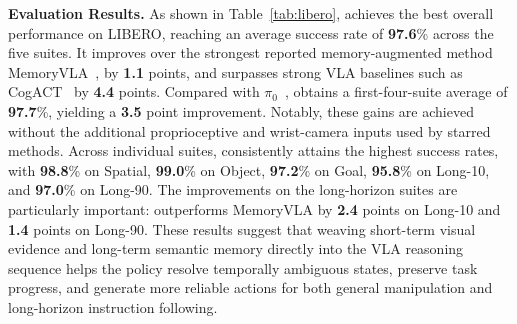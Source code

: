 \noindent\textbf{Evaluation Results.}
As shown in Table~\ref{tab:libero}, \ourmethod achieves the best overall performance on LIBERO, reaching an average success rate of \textbf{97.6}\% across the five suites.
It improves over the strongest reported memory-augmented method MemoryVLA~\citep{shi2025memoryvla}, by \textbf{1.1} points, and surpasses strong VLA baselines such as CogACT~\citep{li2024cogact} by \textbf{4.4} points.
Compared with $\pi_0$~\citep{black2024pi_0}, \ourmethod obtains a first-four-suite average of \textbf{97.7}\%, yielding a \textbf{3.5} point improvement.
Notably, these gains are achieved without the additional proprioceptive and wrist-camera inputs used by starred methods.
Across individual suites, \ourmethod consistently attains the highest success rates, with \textbf{98.8}\% on Spatial, \textbf{99.0}\% on Object, \textbf{97.2}\% on Goal, \textbf{95.8}\% on Long-10, and \textbf{97.0}\% on Long-90.
The improvements on the long-horizon suites are particularly important: \ourmethod outperforms MemoryVLA by \textbf{2.4} points on Long-10 and \textbf{1.4} points on Long-90.
These results suggest that weaving short-term visual evidence and long-term semantic memory directly into the VLA reasoning sequence helps the policy resolve temporally ambiguous states, preserve task progress, and generate more reliable actions for both general manipulation and long-horizon instruction following.


